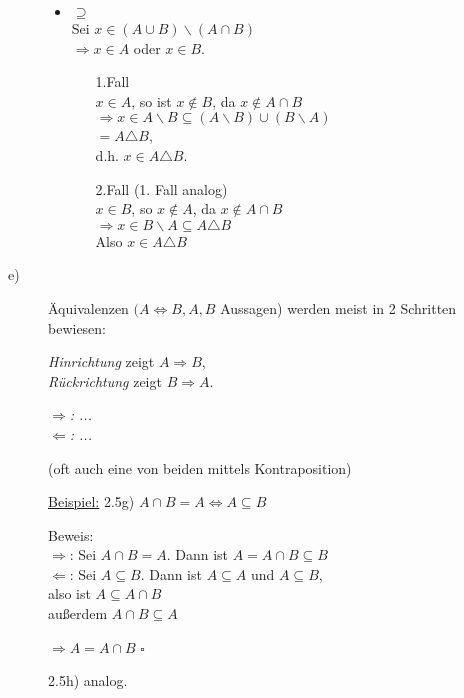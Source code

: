 \documentclass[a4paper, 12pt, twoside] {article}
\begin{document}
\begin{description}
\begin{itemize}
\item{$\supseteq$} \\
Sei $x \in (A \cup B) \backslash (A \cap B)$ \\
$\Rightarrow x \in A$ oder $x \in B$.

\begin{itemize}
\item[1.Fall] \hfill \\
$x \in A$, so ist $x \notin B$, da $x \notin A \cap B$ \\
$\Rightarrow x \in A \backslash B \subseteq (A \backslash B) \cup (B \backslash A)$ \\
$ = A \triangle B$, \\
d.h. $x \in A \triangle B$.

\item[2.Fall] (1. Fall analog) \hfill \\
$x \in B$, so $x \notin A$, da $x \notin A \cap B$ \\
$\Rightarrow x \in B \backslash A \subseteq A \triangle B$ \\
Also $x \in A \triangle B$
\end{itemize}

\end{itemize}

\item[e)]
Äquivalenzen $(A \Leftrightarrow B, A, B$ Aussagen) werden meist in 2 Schritten bewiesen:

\textit{Hinrichtung} zeigt $A \Rightarrow B$, \\
\textit{Rückrichtung} zeigt $B \Rightarrow A$.

\textit{$\Rightarrow$: ...} \\
\textit{$\Leftarrow$: ...}

(oft auch eine von beiden mittels Kontraposition)

\underline{Beispiel:} 2.5g) $A \cap B = A \Leftrightarrow A \subseteq B$

Beweis: \\
\textit{$\Rightarrow$}: Sei $ A \cap B = A$. Dann ist $A = A \cap B \subseteq B$ \\
\textit{$\Leftarrow$}: Sei $A \subseteq B$. Dann ist $A \subseteq A$ und $A \subseteq B$, \\
also ist $A \subseteq A \cap B$ \\
außerdem $A \cap B \subseteq A$

$\Rightarrow A = A \cap B$ \hfill $\square$

2.5h) analog.


\end{description}
\end{document}
